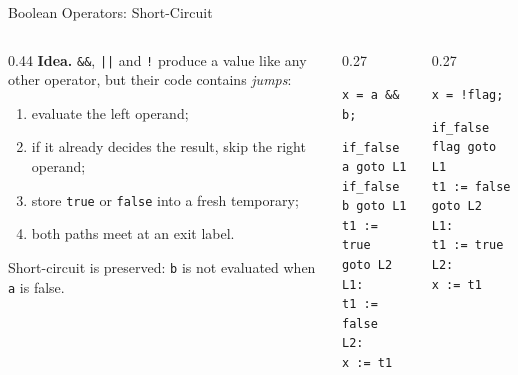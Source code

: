 \documentclass[aspectratio=169,11pt,xcolor=table]{beamer}
\newcommand{\tc}[1]{\texttt{#1}}
\begin{document}
\begin{frame}[fragile]{Boolean Operators: Short-Circuit}
  \begin{columns}[T]
    \begin{column}{0.44\textwidth}
      \textbf{Idea.} \tc{\&\&}, \tc{||} and \tc{!} produce a value like
      any other operator, but their code contains \emph{jumps}:
      \begin{enumerate}
        \item evaluate the left operand;
        \item if it already decides the result, skip the right operand;
        \item store \tc{true} or \tc{false} into a fresh temporary;
        \item both paths meet at an exit label.
      \end{enumerate}
      Short-circuit is preserved: \tc{b} is not evaluated when \tc{a} is false.
    \end{column}
    \begin{column}{0.27\textwidth}
      \begin{block}{\tc{x = a \&\& b;}}
        \begin{verbatim}
if_false a goto L1
if_false b goto L1
t1 := true
goto L2
L1:
t1 := false
L2:
x := t1
        \end{verbatim}
      \end{block}
    \end{column}
    \begin{column}{0.27\textwidth}
      \begin{block}{\tc{x = !flag;}}
        \begin{verbatim}
if_false flag goto L1
t1 := false
goto L2
L1:
t1 := true
L2:
x := t1
        \end{verbatim}
      \end{block}
    \end{column}
  \end{columns}
\end{frame}
\end{document}
